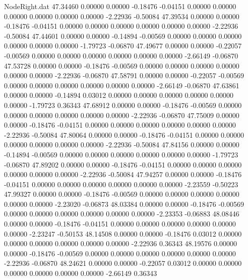 \begin{filecontents}{NodeRight.dat}
  47.34460    0.00000    0.00000    -0.18476   -0.04151    0.00000    0.00000    0.00000    0.00000    0.00000    0.00000   -2.22936   -0.50084
  47.39534    0.00000    0.00000    -0.18476   -0.04151    0.00000    0.00000    0.00000    0.00000    0.00000    0.00000   -2.22936   -0.50084
  47.44601    0.00000    0.00000    -0.14894   -0.00569    0.00000    0.00000    0.00000    0.00000    0.00000    0.00000   -1.79723   -0.06870
  47.49677    0.00000    0.00000    -0.22057   -0.00569    0.00000    0.00000    0.00000    0.00000    0.00000    0.00000   -2.66149   -0.06870
  47.53728    0.00000    0.00000    -0.18476   -0.00569    0.00000    0.00000    0.00000    0.00000    0.00000    0.00000   -2.22936   -0.06870
  47.58791    0.00000    0.00000    -0.22057   -0.00569    0.00000    0.00000    0.00000    0.00000    0.00000    0.00000   -2.66149   -0.06870
  47.63861    0.00000    0.00000    -0.14894    0.03012    0.00000    0.00000    0.00000    0.00000    0.00000    0.00000   -1.79723    0.36343
  47.68912    0.00000    0.00000    -0.18476   -0.00569    0.00000    0.00000    0.00000    0.00000    0.00000    0.00000   -2.22936   -0.06870
  47.75009    0.00000    0.00000    -0.18476   -0.04151    0.00000    0.00000    0.00000    0.00000    0.00000    0.00000   -2.22936   -0.50084
  47.80064    0.00000    0.00000    -0.18476   -0.04151    0.00000    0.00000    0.00000    0.00000    0.00000    0.00000   -2.22936   -0.50084
  47.84156    0.00000    0.00000    -0.14894   -0.00569    0.00000    0.00000    0.00000    0.00000    0.00000    0.00000   -1.79723   -0.06870
  47.89202    0.00000    0.00000    -0.18476   -0.04151    0.00000    0.00000    0.00000    0.00000    0.00000    0.00000   -2.22936   -0.50084
  47.94257    0.00000    0.00000    -0.18476   -0.04151    0.00000    0.00000    0.00000    0.00000    0.00000    0.00000   -2.23559   -0.50223
  47.99327    0.00000    0.00000    -0.18476   -0.00569    0.00000    0.00000    0.00000    0.00000    0.00000    0.00000   -2.23020   -0.06873
  48.03384    0.00000    0.00000    -0.18476   -0.00569    0.00000    0.00000    0.00000    0.00000    0.00000    0.00000   -2.23353   -0.06883
  48.08446    0.00000    0.00000    -0.18476   -0.04151    0.00000    0.00000    0.00000    0.00000    0.00000    0.00000   -2.23247   -0.50153
  48.14508    0.00000    0.00000    -0.18476    0.03012    0.00000    0.00000    0.00000    0.00000    0.00000    0.00000   -2.22936    0.36343
  48.19576    0.00000    0.00000    -0.18476   -0.00569    0.00000    0.00000    0.00000    0.00000    0.00000    0.00000   -2.22936   -0.06870
  48.24621    0.00000    0.00000    -0.22057    0.03012    0.00000    0.00000    0.00000    0.00000    0.00000    0.00000   -2.66149    0.36343

\end{filecontents}

